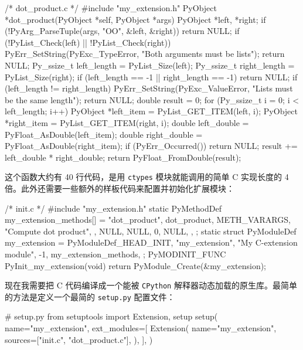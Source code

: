 \begin{codebox}[c]
/* dot_product.c */
#include "my_extension.h"
PyObject *dot_product(PyObject *self, PyObject *args)
{
    PyObject *left, *right;
    if (!PyArg_ParseTuple(args, "OO", &left, &right)) {
        return NULL;
    }
    if (!PyList_Check(left) || !PyList_Check(right)) {
         PyErr_SetString(PyExc_TypeError,
"Both arguments must be lists");
        return NULL;
    }
    Py_ssize_t left_length = PyList_Size(left);
    Py_ssize_t right_length = PyList_Size(right);
    if (left_length == -1 || right_length == -1) {
        return NULL;
    }
    if (left_length != right_length) {
         PyErr_SetString(PyExc_ValueError,
"Lists must be the same length");
        return NULL;
    }
    double result = 0;
    for (Py_ssize_t i = 0; i < left_length; i++) {
        PyObject *left_item = PyList_GET_ITEM(left, i);
        PyObject *right_item = PyList_GET_ITEM(right, i);
        double left_double = PyFloat_AsDouble(left_item);
        double right_double = PyFloat_AsDouble(right_item);
        if (PyErr_Occurred()) {
            return NULL;
        }
        result += left_double * right_double;
    }
    return PyFloat_FromDouble(result);
}
\end{codebox}

这个函数大约有 40 行代码，是用 \texttt{ctypes} 模块就能调用的简单 C 实现长度的 4 倍。此外还需要一些额外的样板代码来配置并初始化扩展模块：

\begin{codebox}[c]
/* init.c */
#include "my_extension.h"
static PyMethodDef my_extension_methods[] = {
    {
        "dot_product",
        dot_product,
        METH_VARARGS,
        "Compute dot product",
    },
    {
        NULL,
        NULL,
        0,
        NULL,
    },
};
static struct PyModuleDef my_extension = {
    PyModuleDef_HEAD_INIT,
    "my_extension",
    "My C-extension module",
    -1,
    my_extension_methods,
};
PyMODINIT_FUNC
PyInit_my_extension(void)
{
    return PyModule_Create(&my_extension);
}
\end{codebox}

现在我需要把 C 代码编译成一个能被 \texttt{CPython} 解释器动态加载的原生库。最简单的方法是定义一个最简的 \texttt{setup.py} 配置文件：

\begin{codebox}[python]
# setup.py
from setuptools import Extension, setup
setup(
    name="my_extension",
    ext_modules=[
        Extension(
            name="my_extension",
            sources=["init.c", "dot_product.c"],
        ),
    ],
)
\end{codebox}

